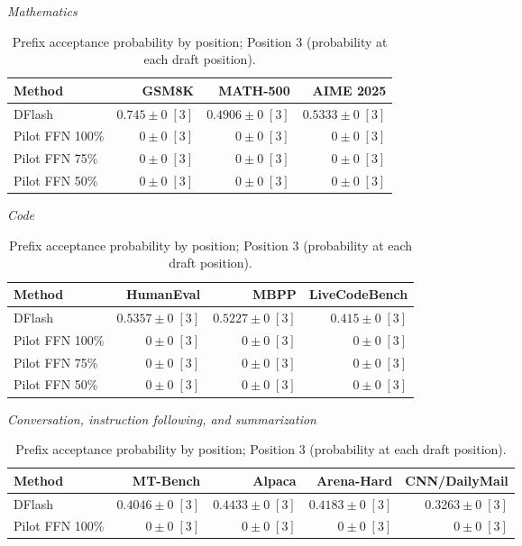 \documentclass[conference,onecolumn]{IEEEtran}
\begin{document}
\begin{table}[!htp]
\centering\small
\setlength{\tabcolsep}{3pt}
\caption{Prefix acceptance probability by position; Position 3 (probability at each draft position).}
\label{tab:appendix-metric-prefix-survival-3}
\textit{Mathematics}\par\smallskip
\begin{tabular}{@{}>{\raggedright\arraybackslash}p{3.7cm}rrr@{}}
\toprule
Method & GSM8K & MATH-500 & AIME 2025 \\
\midrule
DFlash & \(\mathbf{0.745} \pm 0\;[3]\) & \(\mathbf{0.4906} \pm 0\;[3]\) & \(\mathbf{0.5333} \pm 0\;[3]\) \\
Pilot FFN 100\% & \(0 \pm 0\;[3]\) & \(0 \pm 0\;[3]\) & \(0 \pm 0\;[3]\) \\
Pilot FFN 75\% & \(0 \pm 0\;[3]\) & \(0 \pm 0\;[3]\) & \(0 \pm 0\;[3]\) \\
Pilot FFN 50\% & \(0 \pm 0\;[3]\) & \(0 \pm 0\;[3]\) & \(0 \pm 0\;[3]\) \\
\bottomrule
\end{tabular}\par\medskip
\textit{Code}\par\smallskip
\begin{tabular}{@{}>{\raggedright\arraybackslash}p{3.7cm}rrr@{}}
\toprule
Method & HumanEval & MBPP & LiveCodeBench \\
\midrule
DFlash & \(\mathbf{0.5357} \pm 0\;[3]\) & \(\mathbf{0.5227} \pm 0\;[3]\) & \(\mathbf{0.415} \pm 0\;[3]\) \\
Pilot FFN 100\% & \(0 \pm 0\;[3]\) & \(0 \pm 0\;[3]\) & \(0 \pm 0\;[3]\) \\
Pilot FFN 75\% & \(0 \pm 0\;[3]\) & \(0 \pm 0\;[3]\) & \(0 \pm 0\;[3]\) \\
Pilot FFN 50\% & \(0 \pm 0\;[3]\) & \(0 \pm 0\;[3]\) & \(0 \pm 0\;[3]\) \\
\bottomrule
\end{tabular}\par\medskip
\textit{Conversation, instruction following, and summarization}\par\smallskip
\begin{tabular}{@{}>{\raggedright\arraybackslash}p{3.7cm}rrrr@{}}
\toprule
Method & MT-Bench & Alpaca & Arena-Hard & CNN/DailyMail \\
\midrule
DFlash & \(\mathbf{0.4046} \pm 0\;[3]\) & \(\mathbf{0.4433} \pm 0\;[3]\) & \(\mathbf{0.4183} \pm 0\;[3]\) & \(\mathbf{0.3263} \pm 0\;[3]\) \\
Pilot FFN 100\% & \(0 \pm 0\;[3]\) & \(0 \pm 0\;[3]\) & \(0 \pm 0\;[3]\) & \(0 \pm 0\;[3]\) \\

\end{tabular}
\end{table}
\end{document}
